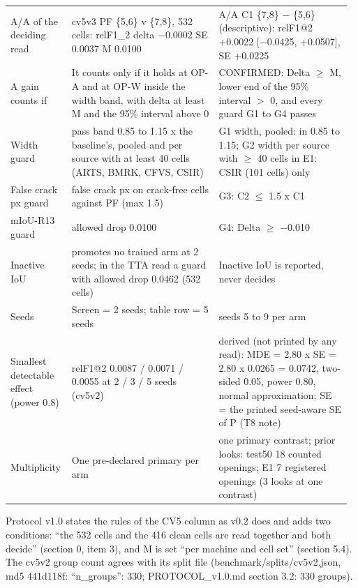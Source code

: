 \begin{table}[htbp]
\begin{tabular}{@{}>{\raggedright\arraybackslash\hspace{0pt}}p{0.155\linewidth}>{\raggedright\arraybackslash\hspace{0pt}}p{0.425\linewidth}>{\raggedright\arraybackslash\hspace{0pt}}p{0.387\linewidth}@{}}
A/\allowbreak{}A of the deciding read & cv5v3 PF \{5,6\} v \{7,8\}, 532 cells: relF1\_\allowbreak{}2 delta $-$0.0002 SE 0.0037 M 0.0100 & A/\allowbreak{}A C1 \{7,8\} $-$ \{5,6\} (descriptive): relF1@2 +0.0022 [$-$0.0425, +0.0507], SE +0.0225 \\
A gain counts if & It counts only if it holds at OP-A and at OP-W inside the width band, with delta at least M and the 95\% interval above 0 & CONFIRMED: Delta $\geq$ M, lower end of the 95\% interval $>$ 0, and every guard G1 to G4 passes \\
Width guard & pass band 0.85 to 1.15 x the baseline's, pooled and per source with at least 40 cells (ARTS, BMRK, CFVS, CSIR) & G1 width, pooled: in 0.85 to 1.15; G2 width per source with $\geq$ 40 cells in E1: CSIR (101 cells) only \\
False crack px guard & false crack px on crack-free cells against PF (max 1.5) & G3: C2 $\leq$ 1.5 x C1 \\
mIoU-R13 guard & allowed drop 0.0100 & G4: Delta $\geq$ $-$0.010 \\
Inactive IoU & promotes no trained arm at 2 seeds; in the TTA read a guard with allowed drop 0.0462 (532 cells) & Inactive IoU is reported, never decides \\
Seeds & Screen = 2 seeds; table row = 5 seeds & seeds 5 to 9 per arm \\
Smallest detectable effect (power 0.8) & relF1@2 0.0087 / 0.0071 / 0.0055 at 2 / 3 / 5 seeds (cv5v2) & derived (not printed by any read): MDE = 2.80 x SE = 2.80 x 0.0265 = 0.0742, two-sided 0.05, power 0.80, normal approximation; SE = the printed seed-aware SE of P (T8 note) \\
Multiplicity & One pre-declared primary per arm & one primary contrast; prior looks: test50 18 counted openings; E1 7 registered openings (3 looks at one contrast) \\
\bottomrule
\end{tabular}
\par\smallskip
\begin{minipage}{\linewidth}\scriptsize\raggedright
Protocol v1.0 states the rules of the CV5 column as v0.2 does and adds two conditions: ``the 532 cells and the 416 clean cells are read together and both decide'' (section 0, item 3), and M is set ``per machine and cell set'' (section 5.4). The cv5v2 group count agrees with its split file (benchmark/\allowbreak{}splits/\allowbreak{}cv5v2.json, md5 441d118f: ``n\_\allowbreak{}groups'': 330; PROTOCOL\_\allowbreak{}v1.0.md section 3.2: 330 groups).\par
\end{minipage}
\end{table}

